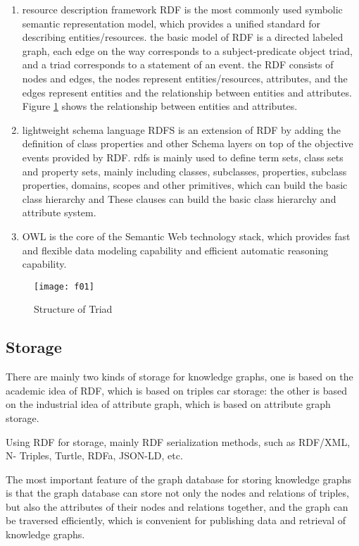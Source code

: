 \begin{enumerate}
\item resource description framework RDF is the most commonly used symbolic semantic representation model, which provides a unified standard for describing entities/resources. the basic model of RDF is a directed labeled graph, each edge on the way corresponds to a subject-predicate object triad, and a triad corresponds to a statement of an event. the RDF consists of nodes and edges, the nodes represent entities/resources, attributes, and the edges represent entities and the relationship between entities and attributes. Figure \ref{triad1} shows the relationship between entities and attributes.
\item lightweight schema language RDFS is an extension of RDF by adding the definition of class properties and other Schema layers on top of the objective events provided by RDF. rdfs is mainly used to define term sets, class sets and property sets, mainly including classes, subclasses, properties, subclass properties, domains, scopes and other primitives, which can build the basic class hierarchy and These clauses can build the basic class hierarchy and attribute system.
\item OWL is the core of the Semantic Web technology stack, which provides fast and flexible data modeling capability and efficient automatic reasoning capability.
\end{enumerate}

\begin{figure}[h]
  \centering
  \texttt{[image: f01]}
  \caption{Structure of Triad}
  \label{triad1}
\end{figure}

\subsection{Storage}
There are mainly two kinds of storage for knowledge graphs, one is based on the academic idea of RDF, which is based on triples car storage: the other is based on the industrial idea of attribute graph, which is based on attribute graph storage.

Using RDF for storage, mainly RDF serialization methods, such as RDF/XML, N- Triples, Turtle, RDFa, JSON-LD, etc.

The most important feature of the graph database for storing knowledge graphs is that the graph database can store not only the nodes and relations of triples, but also the attributes of their nodes and relations together, and the graph can be traversed efficiently, which is convenient for publishing data and retrieval of knowledge graphs.

